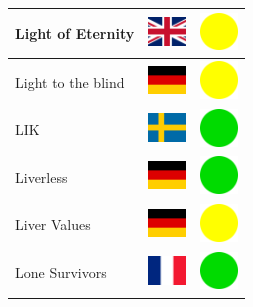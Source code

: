 \documentclass[12pt, a4paper, twoside]{report}
\begin{document}
\begin{center}
\begin{longtable}{|p{5cm}|p{2cm}|p{2cm}|}
 Light of Eternity                                          & \includegraphics[width=1cm]{../img/flags/gb} &   \includegraphics[width=1cm]{../likes/m} \\ \hline
 Light to the blind                                         & \includegraphics[width=1cm]{../img/flags/de} &   \includegraphics[width=1cm]{../likes/m} \\ \hline
 LIK                                                        & \includegraphics[width=1cm]{../img/flags/se} &   \includegraphics[width=1cm]{../likes/y} \\ \hline
 Liverless                                                  & \includegraphics[width=1cm]{../img/flags/de} &   \includegraphics[width=1cm]{../likes/y} \\ \hline
 Liver Values                                               & \includegraphics[width=1cm]{../img/flags/de} &   \includegraphics[width=1cm]{../likes/m} \\ \hline
 Lone Survivors                                             & \includegraphics[width=1cm]{../img/flags/fr} &   \includegraphics[width=1cm]{../likes/y} \\ \hline

\end{longtable}
\end{center}
\end{document}
